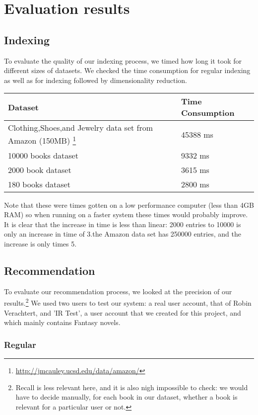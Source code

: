 \documentclass[10pt,a4paper]{paper}
\begin{document}
\section{Evaluation results}

\subsection{Indexing}

To evaluate the quality of our indexing process, we timed how long it took for different sizes of datasets. We checked the time consumption for regular indexing as well as for indexing followed by dimensionality reduction. 

\begin{tabular} {l|l}
Dataset & Time Consumption \\ \hline
Clothing,Shoes,and Jewelry data set from Amazon (150MB) \footnote{\url{http://jmcauley.ucsd.edu/data/amazon/}} &  45388 ms \\ \hline
10000 books dataset & 9332 ms \\ \hline
2000 book dataset & 3615 ms \\ \hline
180 books dataset & 2800 ms \\ \hline

\end{tabular}
Note that these were times gotten on a low performance computer (less than 4GB RAM) so when running on a faster system these times would probably improve.
It is clear that the increase in time is less than linear: 2000 entries to 10000 is only an increase in time of 3.the Amazon data set has 250000 entries, and the increase is only times 5.


\subsection{Recommendation}

To evaluate our recommendation process, we looked at the precision of our results.\footnote{Recall is less relevant here, and it is also nigh impossible to check: we would have to decide manually, for each book in our dataset, whether a book is relevant for a particular user or not.} We used two users to test our system: a real user account, that of Robin Verachtert, and 'IR Test', a user account that we created for this project, and which mainly contains Fantasy novels.

\subsubsection{Regular}
\end{document}
